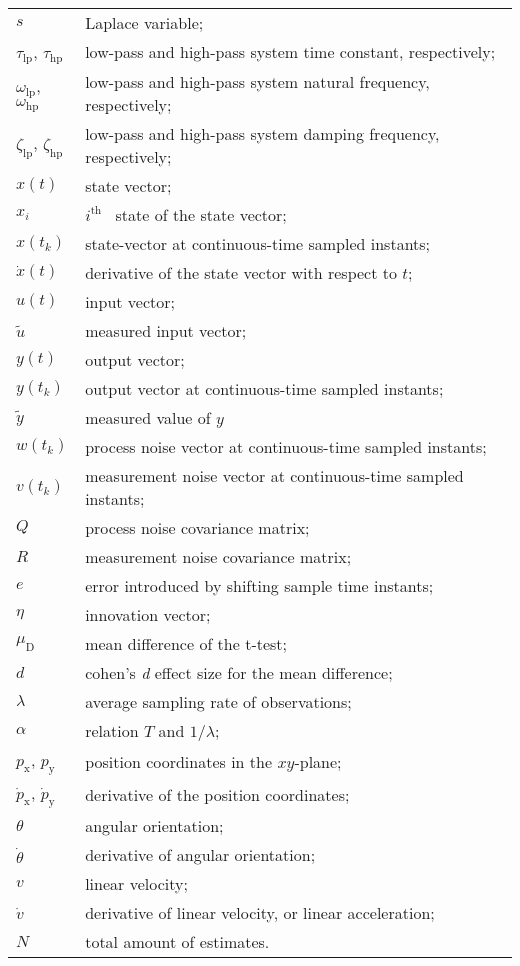 \begin{longtable}{ll}
	$s$						& Laplace variable; \\
	$\tau_{\textrm{lp}}$,
	$\tau_{\textrm{hp}}$	& low-pass and high-pass system time constant, respectively; \\
	$\omega_{\textrm{lp}}$,
	$\omega_{\textrm{hp}}$	& low-pass and high-pass system natural frequency, respectively; \\
	$\zeta_{\textrm{lp}}$,
	$\zeta_{\textrm{hp}}$	& low-pass and high-pass system damping frequency, respectively; \\
	$x(t)$					& state vector; \\
	$x_i$					& $i^{\textrm{th}}$ \ state of the state vector; \\
	$x(t_k)$				& state-vector at continuous-time sampled instants; \\
	$\dot{x}(t)$			& derivative of the state vector with respect to $t$; \\
	$u(t)$					& input vector; \\
	$\tilde{u}$				& measured input vector; \\
	$y(t)$					& output vector; \\
	$y(t_k)$				& output vector at continuous-time sampled instants;\\
	$\tilde{y}$				& measured value of $y$ \\
	$w(t_k)$				& process noise vector at continuous-time sampled instants; \\
	$v(t_k)$				& measurement noise vector at continuous-time sampled instants; \\
	$Q$						& process noise covariance matrix; \\
	$R$						& measurement noise covariance matrix; \\
	$e$						& error introduced by shifting sample time instants; \\
	$\eta$					& innovation vector; \\
	$\mu_{\textrm{D}}$		& mean difference of the t-test; \\
	$d$						& cohen's \textit{d} effect size for the mean difference; \\
	
	$\lambda$				& average sampling rate of observations; \\
	$\alpha$				& relation $T$ and $1/ \lambda$; \\
	
	$p_\textrm{x}$,
	$p_\textrm{y}$			& position coordinates in the $xy$-plane; \\
	$\dot{p}_\textrm{x}$,
	$\dot{p}_\textrm{y}$ 	& derivative of the position coordinates; \\
	$\theta$				& angular orientation; \\
	$\dot{\theta}$			& derivative of angular orientation; \\
	$v$						& linear velocity; \\
	$\dot{v}$				& derivative of linear velocity, or linear acceleration; \\
	$N$						& total amount of estimates. \\

\end{longtable}


